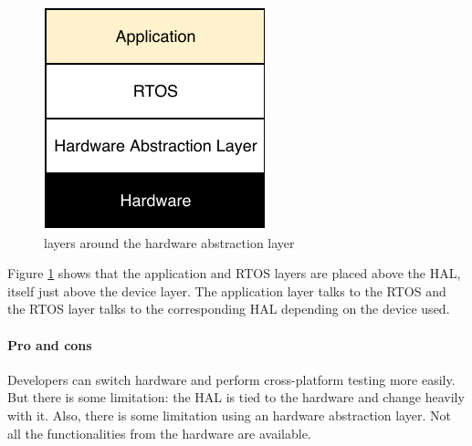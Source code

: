 \begin{figure}[!h]
  \centering
  \includegraphics[scale=1]{assets/hal-layers.pdf}
  \caption{\label{fig:hal-layer}layers around the hardware abstraction layer}
\end{figure}

Figure \ref{fig:hal-layer} shows that the application and RTOS layers are placed above the HAL, itself just above the device layer.
The application layer talks to the RTOS and the RTOS layer talks to the corresponding HAL depending on the device used.

\paragraph{Pro and cons}
Developers can switch hardware and perform cross-platform testing more easily.
But there is some limitation: the HAL is tied to the hardware and change heavily with it.
Also, there is some limitation using an hardware abstraction layer.
Not all the functionalities from the hardware are available.